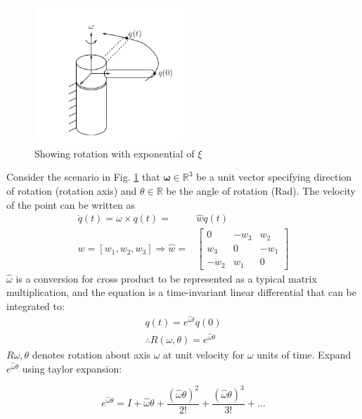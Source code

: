 \documentclass[letterpaper]{article}
\begin{document}
\begin{figure}
  \centering
  \includegraphics[width=0.5\textwidth]{figs/expo-v.png}
  \caption{Showing rotation with exponential of $\xi$} \label{fig:rot-xi}
\end{figure}

Consider the scenario in Fig. \ref{fig:rot-xi} that $\mathbf{\omega} \in \mathbb{R}^{3}$ be a unit vector specifying direction of rotation
(rotation axis) and $\theta\in \mathbb{R}$ be the angle of rotation (Rad). The velocity of the point can be written as
\begin{equation*}
  \begin{split}
    \dot{q}(t) = \omega \times q(t) = & \widehat{w}q(t)\\
    w = [w_1, w_2, w_3] \Rightarrow \widehat{w} = & \begin{bmatrix}
      0 & -w_3 & w_2 \\ w_3 & 0 & -w_1 \\ -w_2 & w_1 & 0
    \end{bmatrix}
  \end{split}
\end{equation*}
$\widehat{\omega}$ is a conversion for cross product to be represented as a typical matrix multiplication, and the equation
is a time-invariant linear differential that can be integrated to:
\begin{equation}
  \begin{split}
    q(t) = e^{\widehat{\omega}t}q(0) \\
    \therefore R(\omega, \theta) = e^{\widehat{\omega}\theta}
  \end{split}
\end{equation}
$R{\omega, \theta}$ denotes rotation about axis $\omega$ at unit velocity for $\omega$ units of time. Expand $e^{\widehat{\omega}\theta}$
using taylor expansion: 

\begin{equation} \label{eqn:tyex}
  e^{\widehat{\omega}\theta} = I + \widehat{\omega}\theta + \frac{(\widehat{\omega}\theta)^2}{2!} + \frac{(\widehat{\omega}\theta)^3}{3!} + ... 
\end{equation}
\end{document}
